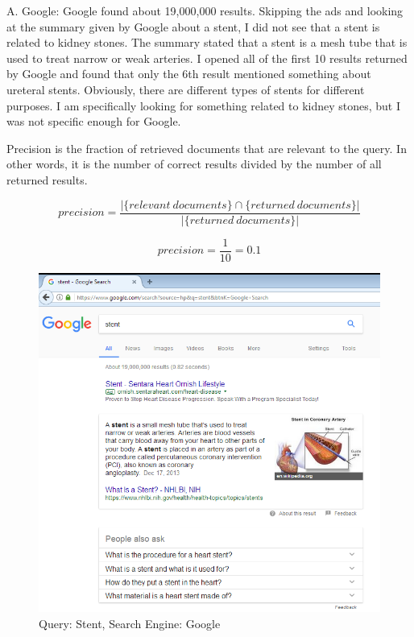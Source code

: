 \documentclass[a4paper, 11pt]{article}
\begin{document}
A. Google:
Google found about 19,000,000 results. Skipping the ads and looking at the summary given by Google about a stent, I did not see that a stent is related to kidney stones. The summary stated that a stent is a mesh tube that is used to treat narrow or weak arteries. I opened all of the first 10 results returned by Google and found that only the 6th result mentioned something about ureteral stents. Obviously, there are different types of stents for different purposes. I am specifically looking for something related to kidney stones, but I was not specific enough for Google.

Precision is the fraction of retrieved documents that are relevant to the query. In other words, it is the number of correct results divided by the number of all returned results.

$$ 
precision = \frac{|\{relevant\ documents\} \cap \{returned\ documents\}|}{|\{returned\ documents\}|}
$$

$$ 
precision = \frac{1}{10} = 0.1
$$

\pagebreak

\begin{figure}[h]
\caption{Query: Stent, Search Engine: Google}
\centering
\includegraphics[scale=0.7]{Q1/stent_Google.png}
\end{figure}
\end{document}
